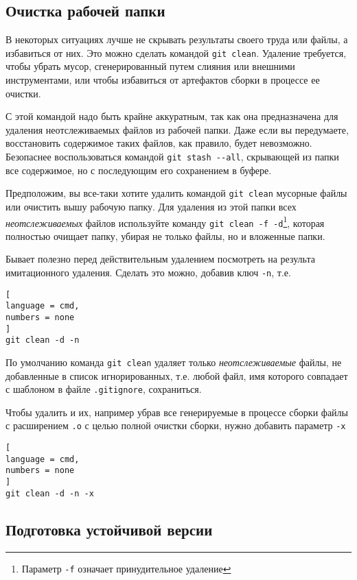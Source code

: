 \documentclass[%
	11pt,
	a4paper,
	utf8,
		]{article}
\begin{document}
\subsection{Очистка рабочей папки}

В некоторых ситуациях лучше не скрывать результаты своего труда или файлы, а избавиться от них. Это можно сделать командой \texttt{git clean}. Удаление требуется, чтобы убрать мусор, сгенерированный путем слияния или внешними инструментами, или чтобы избавиться от артефактов сборки в процессе ее очистки.

С этой командой надо быть крайне аккуратным, так как она предназначена для удаления неотслеживаемых файлов из рабочей папки. Даже если вы передумаете, восстановить содержимое таких файлов, как правило, будет невозможно. Безопаснее воспользоваться командой \lstinline{git stash --all}, скрывающей из папки все содержимое, но с последующим его сохранением в буфере.

Предположим, вы все-таки хотите удалить командой \lstinline{git clean} мусорные файлы или очистить вышу рабочую папку. Для удаления из этой папки всех \emph{неотслеживаемых} файлов используйте команду \lstinline{git clean -f -d}\footnote{Параметр \lstinline{-f} означает принудительное удаление}, которая полностью очищает папку, убирая не только файлы, но и вложенные папки.

Бывает полезно перед действительным удалением посмотреть на результа имитационного удаления. Сделать это можно, добавив ключ \lstinline{-n}, т.е.


\begin{lstlisting}[
language = cmd,
numbers = none
]
git clean -d -n
\end{lstlisting}

По умолчанию команда \lstinline{git clean} удаляет только \emph{неотслеживаемые} файлы, не добавленные в список игнорированных, т.е. любой файл, имя которого совпадает с шаблоном в файле \texttt{.gitignore}, сохраниться.

Чтобы удалить и их, например убрав все генерируемые в процессе сборки файлы с расширением \texttt{.o} с целью полной очистки сборки, нужно добавить параметр \lstinline{-x}


\begin{lstlisting}[
language = cmd,
numbers = none
]
git clean -d -n -x
\end{lstlisting}


\subsection{Подготовка устойчивой версии}
\end{document}
